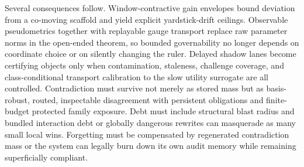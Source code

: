\documentclass[11pt]{article}
\theoremstyle{definition}
\newcommand{\1}{\mathbf{1}}
\begin{document}
Several consequences follow. Window-contractive gain envelopes bound deviation from a co-moving scaffold and yield explicit yardstick-drift ceilings. Observable pseudometrics together with replayable gauge transport replace raw parameter norms in the open-ended theorem, so bounded governability no longer depends on coordinate choice or on silently changing the ruler. Delayed shadow lanes become certifying objects only when contamination, staleness, challenge coverage, and class-conditional transport calibration to the slow utility surrogate are all controlled. Contradiction must survive not merely as stored mass but as basis-robust, routed, inspectable disagreement with persistent obligations and finite-budget protected family exposure. Debt must include structural blast radius and bundled interaction debt or globally dangerous rewrites can masquerade as many small local wins. Forgetting must be compensated by regenerated contradiction mass or the system can legally burn down its own audit memory while remaining superficially compliant.
\end{document}
